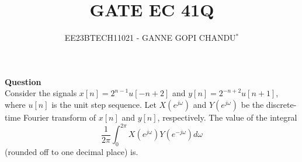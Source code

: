\documentclass[journal,12pt,twocolumn]{IEEEtran}
\theoremstyle{remark}
\begin{document}

\vspace{3cm}
\title{GATE EC 41Q}
\author{EE23BTECH11021 - GANNE GOPI CHANDU$^{*}$%
}
\maketitle
\bigskip
\renewcommand{\thefigure}{\theenumi}
\renewcommand{\thetable}{\theenumi}

\textbf{Question}\\
Consider the signals \(x[n] = 2^{n-1} u[-n+2]\) and \(y[n] = 2^{-n+2} u[n+1]\), where \(u[n]\) is the unit step sequence. Let \(X(e^{j\omega})\) and \(Y(e^{j\omega})\) be the discrete-time Fourier transform of \(x[n]\) and \(y[n]\), respectively. The value of the integral
\[
\frac{1}{2\pi} \int_{0}^{2\pi} X(e^{j\omega}) Y(e^{-j\omega}) d\omega
\]
(rounded off to one decimal place) is.
\end{document}
